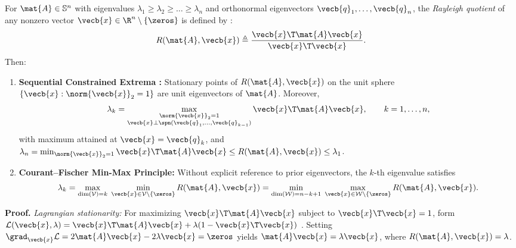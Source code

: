\documentclass[../../../../master.tex]{subfiles}
\begin{document}
\begin{coremath}
\label{thm:svd:courant}
For $\mat{A} \in \mathbb{S}^n$ with eigenvalues $\lambda_1 \ge \lambda_2 \ge \dots \ge \lambda_n$ and orthonormal eigenvectors $\vecb{q}_1, \dots, \vecb{q}_n$, the \emph{Rayleigh quotient} of any nonzero vector $\vecb{x} \in \R^n \setminus \{\zeros\}$ is defined by :
\begin{equation}
\label{eq:svd:rayleigh}
  R(\mat{A}, \vecb{x}) \triangleq \frac{\vecb{x}\T \mat{A} \vecb{x}}{\vecb{x}\T \vecb{x}}.
\end{equation}
Then:
\begin{enumerate}
  \item \textbf{Sequential Constrained Extrema :} Stationary points of $R(\mat{A},\vecb{x})$ on the unit sphere $\{\vecb{x} : \norm{\vecb{x}}_2 = 1\}$ are unit eigenvectors of $\mat{A}$. Moreover,
  \begin{equation}
  \label{eq:svd:seq_rayleigh}
    \lambda_k = \max_{\substack{\norm{\vecb{x}}_2 = 1 \\ \vecb{x} \perp \spn(\vecb{q}_1,\dots,\vecb{q}_{k-1})}} \vecb{x}\T \mat{A} \vecb{x}, \qquad k = 1,\dots,n,
  \end{equation}
  with maximum attained at $\vecb{x} = \vecb{q}_k$, and $\lambda_n = \min_{\norm{\vecb{x}}_2 = 1} \vecb{x}\T \mat{A} \vecb{x} \le R(\mat{A},\vecb{x}) \le \lambda_1$.
  \item \textbf{Courant--Fischer Min-Max Principle:} Without explicit reference to prior eigenvectors, the $k$-th eigenvalue satisfies
  \begin{equation}
  \label{eq:svd:courant}
    \lambda_k = \max_{\dim(\mathcal{V}) = k} \; \min_{\vecb{x} \in \mathcal{V} \setminus \{\zeros\}} R(\mat{A}, \vecb{x})
    = \min_{\dim(\mathcal{W}) = n - k + 1} \; \max_{\vecb{x} \in \mathcal{W} \setminus \{\zeros\}} R(\mat{A}, \vecb{x}).
  \end{equation}
\end{enumerate}

\textbf{Proof.}
\emph{Lagrangian stationarity:} For maximizing $\vecb{x}\T \mat{A} \vecb{x}$ subject to $\vecb{x}\T\vecb{x} = 1$, form $\mathcal{L}(\vecb{x},\lambda) = \vecb{x}\T \mat{A} \vecb{x} + \lambda(1 - \vecb{x}\T\vecb{x})$ . Setting $\grad_{\vecb{x}}\mathcal{L} = 2\mat{A}\vecb{x} - 2\lambda\vecb{x} = \zeros$ yields $\mat{A}\vecb{x} = \lambda\vecb{x}$, where $R(\mat{A},\vecb{x}) = \lambda$.


\end{coremath}
\end{document}

